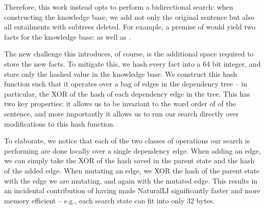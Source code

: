 Therefore, this work instead opts to perform a bidirectional search:
  when constructing the knowledge base, we add not only the original sentence but
  also all entailments with subtrees deleted.
For example, a premise of  would yield two facts
  for the knowledge base:  as well as .

The new challenge this introduces, of course, is the additional space required
  to store the new facts.
To mitigate this, we hash every fact into a 64 bit integer, and store only the hashed 
  value in the knowledge base.
We construct this hash function such that it operates over a bag of edges in the
  dependency tree -- in particular, the XOR of the hash of each dependency edge in
  the tree.
This has two key properties: it allows us to be invariant to the word order of
  of the sentence, and more importantly it allows us to run our search directly
  over modifications to this hash function.

To elaborate, we notice that each of the two classes of operations our search is
  performing are done locally over a single dependency edge.
When adding an edge, we can simply take the XOR of the hash saved in the 
  parent state and the hash of the added edge.
When mutating an edge, we XOR the hash of the parent state with the edge we are
  mutating, and again with the mutated edge.
This results in an incidental contribution of having made NaturalLI significantly
  faster and more memory efficient -- e.g., each search state can fit into
  only 32 bytes.

